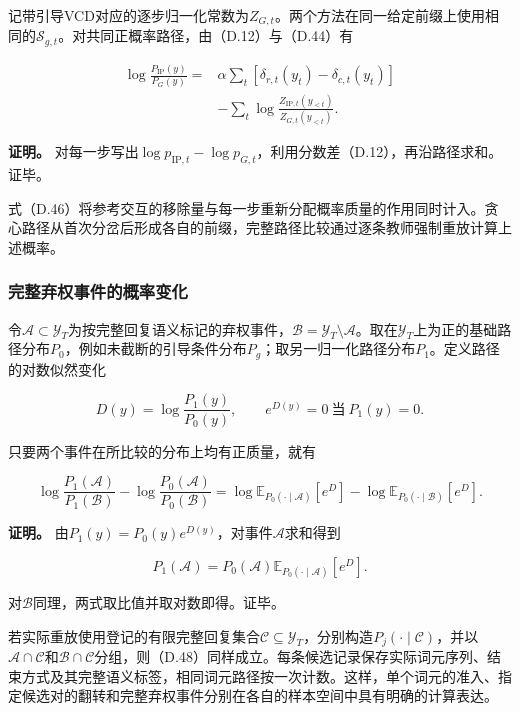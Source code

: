 记带引导VCD对应的逐步归一化常数为\(Z_{G,t}\)。两个方法在同一给定前缀上使用相同的\(\mathcal S_{g,t}\)。对共同正概率路径，由（D.12）与（D.44）有

\[
\begin{aligned}
\log\frac{P_{\mathrm{IP}}(y)}{P_G(y)}
={}&\alpha\sum_t[\delta_{r,t}(y_t)-\delta_{c,t}(y_t)]\\
&-\sum_t\log\frac{Z_{\mathrm{IP},t}(y_{<t})}{Z_{G,t}(y_{<t})}.
\end{aligned}
\tag{D.46}
\]

\textbf{证明。} 对每一步写出\(\log p_{\mathrm{IP},t}-\log p_{G,t}\)，利用分数差（D.12），再沿路径求和。证毕。

式（D.46）将参考交互的移除量与每一步重新分配概率质量的作用同时计入。贪心路径从首次分岔后形成各自的前缀，完整路径比较通过逐条教师强制重放计算上述概率。

\subsubsection{完整弃权事件的概率变化}\label{ux5b8cux6574ux5f03ux6743ux4e8bux4ef6ux7684ux6982ux7387ux53d8ux5316}

令\(\mathcal A\subset\mathcal Y_T\)为按完整回复语义标记的弃权事件，\(\mathcal B=\mathcal Y_T\setminus\mathcal A\)。取在\(\mathcal Y_T\)上为正的基础路径分布\(P_0\)，例如未截断的引导条件分布\(P_g\)；取另一归一化路径分布\(P_1\)。定义路径的对数似然变化

\[
D(y)=\log\frac{P_1(y)}{P_0(y)},
\qquad e^{D(y)}=0\ \text{当}\ P_1(y)=0.
\tag{D.47}
\]

只要两个事件在所比较的分布上均有正质量，就有

\[
\boxed{
\log\frac{P_1(\mathcal A)}{P_1(\mathcal B)}
-\log\frac{P_0(\mathcal A)}{P_0(\mathcal B)}
=\log\mathbb E_{P_0(\cdot\mid\mathcal A)}[e^D]
-\log\mathbb E_{P_0(\cdot\mid\mathcal B)}[e^D].
}
\tag{D.48}
\]

\textbf{证明。} 由\(P_1(y)=P_0(y)e^{D(y)}\)，对事件\(\mathcal A\)求和得到

\[
P_1(\mathcal A)=P_0(\mathcal A)\mathbb E_{P_0(\cdot\mid\mathcal A)}[e^D].
\]

对\(\mathcal B\)同理，两式取比值并取对数即得。证毕。

若实际重放使用登记的有限完整回复集合\(\mathcal C\subseteq\mathcal Y_T\)，分别构造\(P_j(\cdot\mid\mathcal C)\)，并以\(\mathcal A\cap\mathcal C\)和\(\mathcal B\cap\mathcal C\)分组，则（D.48）同样成立。每条候选记录保存实际词元序列、结束方式及其完整语义标签，相同词元路径按一次计数。这样，单个词元的准入、指定候选对的翻转和完整弃权事件分别在各自的样本空间中具有明确的计算表达。

